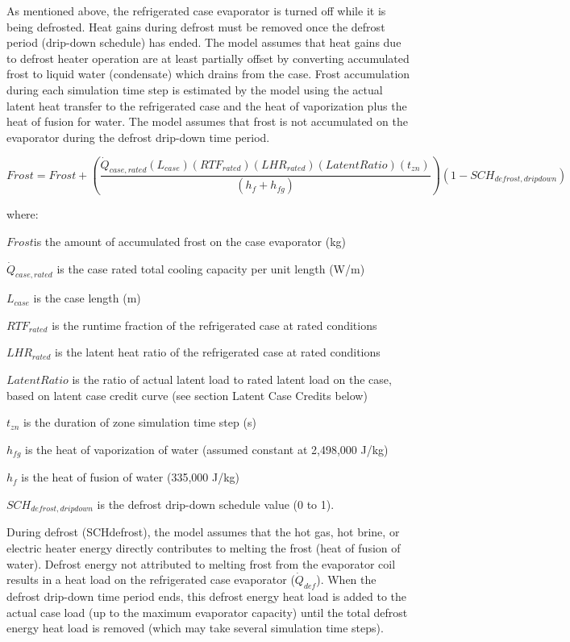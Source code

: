 As mentioned above, the refrigerated case evaporator is turned off while it is being defrosted. Heat gains during defrost must be removed once the defrost period (drip-down schedule) has ended. The model assumes that heat gains due to defrost heater operation are at least partially offset by converting accumulated frost to liquid water (condensate) which drains from the case. Frost accumulation during each simulation time step is estimated by the model using the actual latent heat transfer to the refrigerated case and the heat of vaporization plus the heat of fusion for water. The model assumes that frost is not accumulated on the evaporator during the defrost drip-down time period.

\begin{equation}
Frost = Frost + \left( {\frac{{{{\dot Q}_{case,rated}}\left( {{L_{case}}} \right)\left( {RT{F_{rated}}} \right)\left( {LH{R_{rated}}} \right)\left( {LatentRatio} \right)\left( {{t_{zn}}} \right)}}{{\left( {{h_f} + {h_{fg}}} \right)}}} \right)\left( {1 - SC{H_{defrost,dripdown}}} \right)
\end{equation}

where:

\(Frost\)is the amount of accumulated frost on the case evaporator (kg)

\({\dot Q_{case,rated}}\) is the case rated total cooling capacity per unit length (W/m)

\({L_{case}}\) is the case length (m)

\(RT{F_{rated}}\) is the runtime fraction of the refrigerated case at rated conditions

\(LH{R_{rated}}\) is the latent heat ratio of the refrigerated case at rated conditions

\(LatentRatio\) is the ratio of actual latent load to rated latent load on the case, based on latent case credit curve (see section Latent Case Credits below)

\({t_{zn}}\) is the duration of zone simulation time step (s)

\({h_{fg}}\) is the heat of vaporization of water (assumed constant at 2,498,000 J/kg)

\({h_f}\) is the heat of fusion of water (335,000 J/kg)

\(SC{H_{defrost,dripdown}}\) is the defrost drip-down schedule value (0 to 1).

During defrost (SCHdefrost), the model assumes that the hot gas, hot brine, or electric heater energy directly contributes to melting the frost (heat of fusion of water). Defrost energy not attributed to melting frost from the evaporator coil results in a heat load on the refrigerated case evaporator (\({\dot{Q}_{def}}\)). When the defrost drip-down time period ends, this defrost energy heat load is added to the actual case load (up to the maximum evaporator capacity) until the total defrost energy heat load is removed (which may take several simulation time steps).

